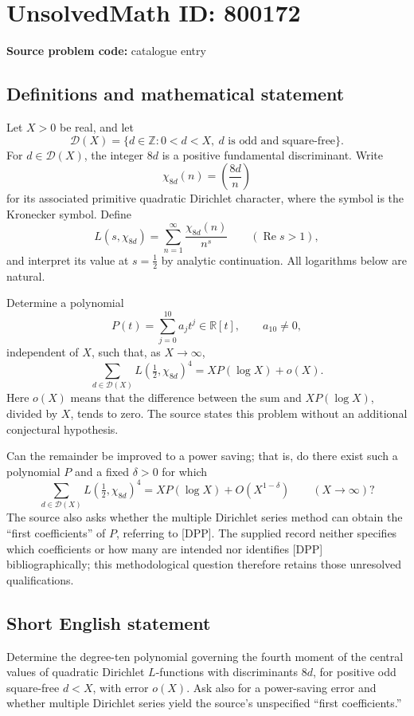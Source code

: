 \documentclass[11pt]{article}
\newcommand{\Z}{\mathbb{Z}}
\newcommand{\R}{\mathbb{R}}
\begin{document}
\section*{UnsolvedMath ID: 800172}
\textbf{Source problem code:} catalogue entry
\subsection{Definitions and mathematical statement}
Let \(X>0\) be real, and let
\[
\mathcal D(X)=\{d\in\Z:0<d<X,\ d\text{ is odd and square-free}\}.
\]
For \(d\in\mathcal D(X)\), the integer \(8d\) is a positive fundamental discriminant. Write
\[
\chi_{8d}(n)=\left(\frac{8d}{n}\right)
\]
for its associated primitive quadratic Dirichlet character, where the symbol is the Kronecker symbol. Define
\[
L(s,\chi_{8d})=\sum_{n=1}^{\infty}\frac{\chi_{8d}(n)}{n^s}
\qquad (\operatorname{Re}s>1),
\]
and interpret its value at \(s=\tfrac12\) by analytic continuation. All logarithms below are natural.

Determine a polynomial
\[
P(t)=\sum_{j=0}^{10}a_jt^j\in\R[t],\qquad a_{10}\ne0,
\]
independent of \(X\), such that, as \(X\to\infty\),
\[
\sum_{d\in\mathcal D(X)}L\!\left(\tfrac12,\chi_{8d}\right)^4
=XP(\log X)+o(X).
\]
Here \(o(X)\) means that the difference between the sum and \(XP(\log X)\), divided by \(X\), tends to zero. The source states this problem without an additional conjectural hypothesis.

Can the remainder be improved to a power saving; that is, do there exist such a polynomial \(P\) and a fixed \(\delta>0\) for which
\[
\sum_{d\in\mathcal D(X)}L\!\left(\tfrac12,\chi_{8d}\right)^4
=XP(\log X)+O\!\left(X^{1-\delta}\right)
\qquad (X\to\infty)?
\]
The source also asks whether the multiple Dirichlet series method can obtain the ``first coefficients'' of \(P\), referring to [DPP]. The supplied record neither specifies which coefficients or how many are intended nor identifies [DPP] bibliographically; this methodological question therefore retains those unresolved qualifications.
\subsection{Short English statement}
Determine the degree-ten polynomial governing the fourth moment of the central values of quadratic Dirichlet \(L\)-functions with discriminants \(8d\), for positive odd square-free \(d<X\), with error \(o(X)\). Ask also for a power-saving error and whether multiple Dirichlet series yield the source's unspecified ``first coefficients.''
\end{document}
